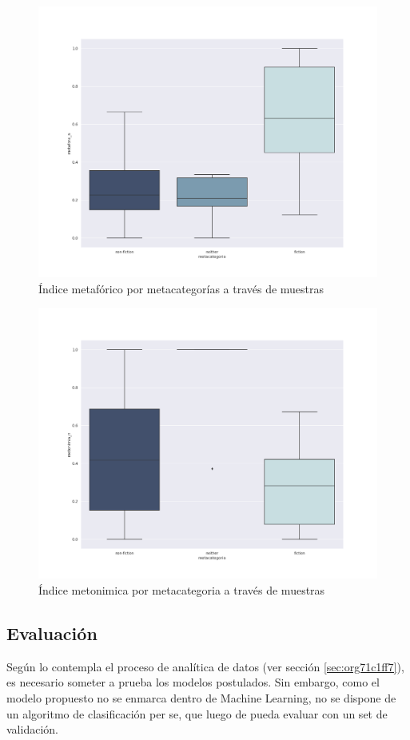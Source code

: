 \documentclass[12pt,letterpaper,twoside]{article}
\begin{document}
\begin{figure}[H]
\centering
\includegraphics[width=0.9\linewidth]{./resultados/graphs/total/metafora_total.png}
\caption{\label{fig:metafora_total} Índice metafórico por metacategorías a través de muestras }
\end{figure}

\begin{figure}[H]
\centering
\includegraphics[width=0.9\linewidth]{./resultados/graphs/total/metonimia_total.png}
\caption{\label{fig:metonimia_total} Índice metonimica por metacategoria a través de muestras }
\end{figure}

\subsection{Evaluación}
\label{sec:orgd7144c8}
Según lo contempla el proceso de analítica de datos (ver sección \ref{sec:org71c1ff7}),
es necesario someter a prueba los modelos postulados. Sin embargo, como el modelo propuesto
no se enmarca dentro de Machine Learning, no se dispone de un algoritmo de clasificación
per se, que luego de pueda evaluar con un set de validación.
\end{document}
